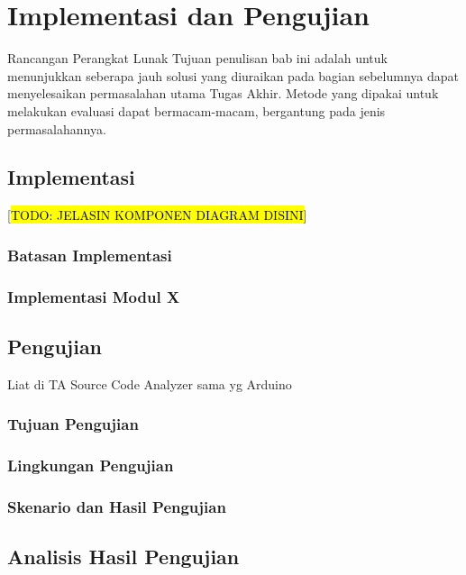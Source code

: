\chapter{Implementasi dan Pengujian}
Rancangan Perangkat Lunak
Tujuan penulisan bab ini adalah untuk menunjukkan seberapa jauh solusi yang diuraikan pada bagian sebelumnya dapat menyelesaikan permasalahan utama Tugas Akhir. Metode yang dipakai untuk melakukan evaluasi dapat bermacam-macam, bergantung pada jenis permasalahannya.

\section{Implementasi}

 [\hl{TODO: JELASIN KOMPONEN DIAGRAM DISINI}]

\subsection{Batasan Implementasi}
\blindtext

\subsection{Implementasi Modul X}
\blindtext


\section{Pengujian}

Liat di TA Source Code Analyzer sama yg Arduino

\subsection{Tujuan Pengujian}
\blindtext

\subsection{Lingkungan Pengujian}
\blindtext

\subsection{Skenario dan Hasil Pengujian}
\blindtext


\section{Analisis Hasil Pengujian}
\blindtext